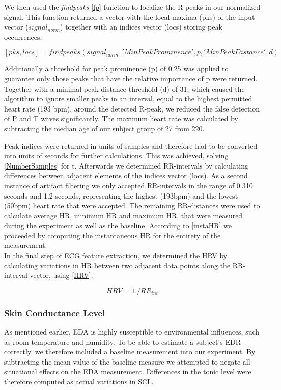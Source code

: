 We then used the \textit{findpeaks} \ref{fp} function to localize the R-peaks in our normalized signal. This function returned a vector with the local maxima (pks) of the input vector ($signal_{norm}$) together with an indices vector (locs) storing peak occurrences. 

\begin{equation}\label{fp}
[pks,locs] = findpeaks(signal_{norm},'MinPeakProminence',p,'MinPeakDistance',d)
\end{equation}

Additionally a threshold for peak prominence (p) of 0.25 was applied to guarantee only those peaks that have the relative importance of p were returned. Together with a minimal peak distance threshold (d) of 31, which caused the algorithm to ignore smaller peaks in an interval, equal to the highest permitted heart rate (193 bpm), around the detected R-peak, we reduced the false detection of P and T waves significantly. The maximum heart rate was calculated by subtracting the median age of our subject group of 27 from 220. 

Peak indices were returned in units of samples and therefore had to be converted into units of seconds for further calculations. This was achieved, solving \ref{NumberSamples} for t. Afterwards we 
determined RR-intervals by calculating differences between adjacent elements of the indices vector (locs). As a second instance of artifact filtering we only accepted RR-intervals in the range of 0.310 seconds and 1.2 seconds, representing the highest (193bpm) and the lowest (50bpm) heart rate that were accepted. The remaining RR-distances were used to calculate average HR, minimum HR and maximum HR, that were measured during the experiment as well as the baseline. According to \ref{instaHR} we proceeded by computing the instantaneous HR for the entirety of the measurement.\\

In the final step of ECG feature extraction, we determined the HRV by calculating variations in HR between two adjacent data points along the RR-interval vector, using \ref{HRV}.

\begin{equation}\label{HRV}
HRV = 1./RR_{int}
\end{equation}  


\subsubsection{Skin Conductance Level}
As mentioned earlier, EDA is highly susceptible to environmental influences, such as room temperature and humidity. To be able to estimate a subject's EDR correctly, we therefore included a baseline measurement into our experiment. By subtracting the mean value of the baseline measure we attempted to negate all situational effects on the EDA measurement. Differences in the tonic level were therefore computed as actual variations in SCL.  

